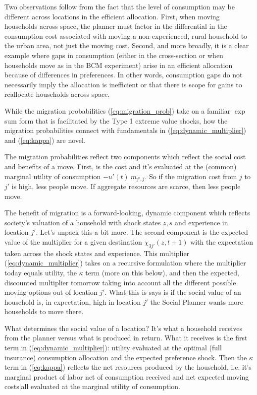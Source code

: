 \documentclass[12pt,pdftex]{article}
\begin{document}
\begin{onehalfspacing}
Two observations follow from the fact that the level of consumption may be different across locations in the efficient allocation. First, when moving households across space, the planner must factor in the differential in the consumption cost associated with moving a non-experienced, rural household to the urban area, not just the moving cost. Second, and more broadly, it is a clear example where gaps in consumption (either in the cross-section or when households move as in the BCM experiment) arise in an efficient allocation because of differences in preferences. In other words, consumption gaps do not necessarily imply the allocation is inefficient or that there is scope for gains to reallocate households across space.

While the migration probabilities (\ref{eq:migration_prob}) take on a familiar $\exp$ sum form that is facilitated by the Type 1 extreme value shocks, how the migration probabilities connect with fundamentals in (\ref{eq:dynamic_multiplier}) and (\ref{eq:kappa}) are novel.

The migration probabilities reflect two components which reflect the social cost and benefits of a move. First, is the cost and it's evaluated at the (common) marginal utility of consumption $-u'(t) \ m_{j',j}$. So if the migration cost from $j$ to $j'$ is high, less people move. If aggregate resources are scarce, then less people move.

The benefit of migration is a forward-looking, dynamic component which reflects society's valuation of a household with shock states $z,s$ and experience in location $j'$. Let's unpack this a bit more. The second component is the expected value of the multiplier for a given destination $\chi_{3j'}(z, t+1)$ with the expectation taken across the shock states and experience. This multiplier (\ref{eq:dynamic_multiplier}) takes on a recursive formulation where the multiplier today equals utility, the $\kappa$ term (more on this below), and then the expected, discounted multiplier tomorrow taking into account all the different possible moving options out of location $j'$. What this is says is if the social value of an household is, in expectation, high in location $j'$ the Social Planner wants more households to move there.

What determines the social value of a location? It's what a household receives from the planner versus what is produced in return. What it receives is the first term in (\ref{eq:dynamic_multiplier}): utility evaluated at the optimal (full insurance) consumption allocation and the expected preference shock. Then the $\kappa$ term in (\ref{eq:kappa}) reflects the net resources produced by the household, i.e. it's marginal product of labor net of consumption received and net expected moving costs|all evaluated at the marginal utility of consumption.


\end{onehalfspacing}
\end{document}
